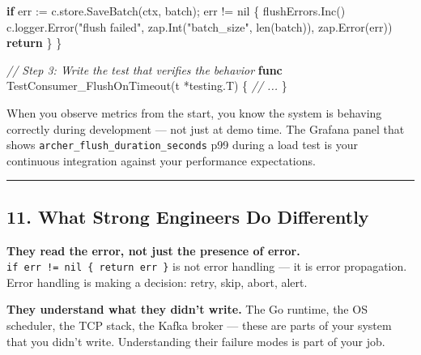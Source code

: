 \documentclass[
]{article}
\newenvironment{Shaded}{}{}
\newcommand{\BuiltInTok}[1]{\textcolor[rgb]{0.00,0.50,0.00}{#1}}
\newcommand{\CommentTok}[1]{\textcolor[rgb]{0.38,0.63,0.69}{\textit{#1}}}
\newcommand{\ControlFlowTok}[1]{\textcolor[rgb]{0.00,0.44,0.13}{\textbf{#1}}}
\newcommand{\KeywordTok}[1]{\textcolor[rgb]{0.00,0.44,0.13}{\textbf{#1}}}
\newcommand{\NormalTok}[1]{#1}
\newcommand{\OperatorTok}[1]{\textcolor[rgb]{0.40,0.40,0.40}{#1}}
\newcommand{\OtherTok}[1]{\textcolor[rgb]{0.00,0.44,0.13}{#1}}
\newcommand{\StringTok}[1]{\textcolor[rgb]{0.25,0.44,0.63}{#1}}
\begin{document}
\begin{Shaded}
\begin{Highlighting}[]
    \ControlFlowTok{if}\NormalTok{ err }\OperatorTok{:=}\NormalTok{ c}\OperatorTok{.}\NormalTok{store}\OperatorTok{.}\NormalTok{SaveBatch}\OperatorTok{(}\NormalTok{ctx}\OperatorTok{,}\NormalTok{ batch}\OperatorTok{);}\NormalTok{ err }\OperatorTok{!=} \OtherTok{nil} \OperatorTok{\{}
\NormalTok{        flushErrors}\OperatorTok{.}\NormalTok{Inc}\OperatorTok{()}
\NormalTok{        c}\OperatorTok{.}\NormalTok{logger}\OperatorTok{.}\NormalTok{Error}\OperatorTok{(}\StringTok{"flush failed"}\OperatorTok{,}\NormalTok{ zap}\OperatorTok{.}\NormalTok{Int}\OperatorTok{(}\StringTok{"batch\_size"}\OperatorTok{,} \BuiltInTok{len}\OperatorTok{(}\NormalTok{batch}\OperatorTok{)),}\NormalTok{ zap}\OperatorTok{.}\NormalTok{Error}\OperatorTok{(}\NormalTok{err}\OperatorTok{))}
        \ControlFlowTok{return}
    \OperatorTok{\}}
\OperatorTok{\}}

\CommentTok{// Step 3: Write the test that verifies the behavior}
\KeywordTok{func}\NormalTok{ TestConsumer\_FlushOnTimeout}\OperatorTok{(}\NormalTok{t }\OperatorTok{*}\NormalTok{testing}\OperatorTok{.}\NormalTok{T}\OperatorTok{)} \OperatorTok{\{}
    \CommentTok{// ...}
\OperatorTok{\}}
\end{Highlighting}
\end{Shaded}

When you observe metrics from the start, you know the system is behaving
correctly during development --- not just at demo time. The Grafana
panel that shows \texttt{archer\_flush\_duration\_seconds} p99 during a
load test is your continuous integration against your performance
expectations.

\begin{center}\rule{0.5\linewidth}{0.5pt}\end{center}

\hypertarget{what-strong-engineers-do-differently}{%
\subsection{11. What Strong Engineers Do
Differently}\label{what-strong-engineers-do-differently}}

\textbf{They read the error, not just the presence of error.}
\texttt{if\ err\ !=\ nil\ \{\ return\ err\ \}} is not error handling ---
it is error propagation. Error handling is making a decision: retry,
skip, abort, alert.

\textbf{They understand what they didn't write.} The Go runtime, the OS
scheduler, the TCP stack, the Kafka broker --- these are parts of your
system that you didn't write. Understanding their failure modes is part
of your job.
\end{document}
